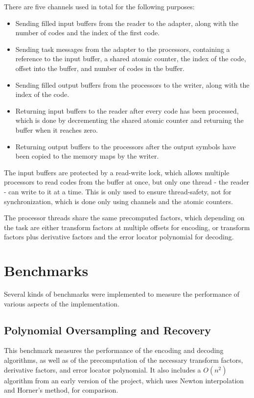 There are five channels used in total for the following purposes:
\begin{itemize}
    \item Sending filled input buffers from the reader to the adapter, along with the number of codes and the index of the first code.
    \item Sending task messages from the adapter to the processors, containing a reference to the input buffer, a shared atomic counter, the index of the code, offset into the buffer, and number of codes in the buffer.
    \item Sending filled output buffers from the processors to the writer, along with the index of the code.
    \item Returning input buffers to the reader after every code has been processed, which is done by decrementing the shared atomic counter and returning the buffer when it reaches zero.
    \item Returning output buffers to the processors after the output symbols have been copied to the memory maps by the writer.
\end{itemize}

The input buffers are protected by a read-write lock, which allows multiple processors to read codes from the buffer at once, but only one thread - the reader - can write to it at a time.
This is only used to ensure thread-safety, not for synchronization, which is done only using channels and the atomic counters.

The processor threads share the same precomputed factors, which depending on the task are either transform factors at multiple offsets for encoding, or transform factors plus derivative factors and the error locator polynomial for decoding.

\section{Benchmarks}

Several kinds of benchmarks were implemented to measure the performance of various aspects of the implementation.

\subsection{Polynomial Oversampling and Recovery}

This benchmark measures the performance of the encoding and decoding algorithms, as well as of the precomputation of the necessary transform factors, derivative factors, and error locator polynomial.
It also includes a $O(n^2)$ algorithm from an early version of the project, which uses Newton interpolation and Horner's method, for comparison.

